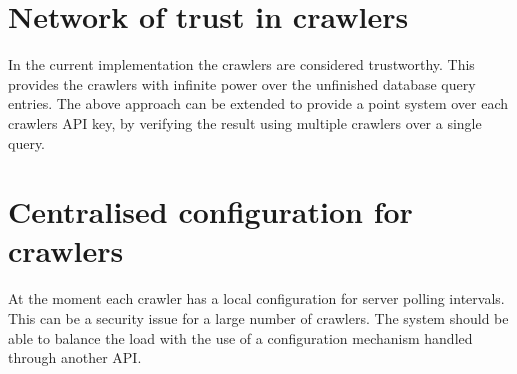    \section{Network of trust in crawlers}
        In the current implementation the crawlers are considered trustworthy.
        This provides the crawlers with infinite power over the unfinished
        database query entries. The above approach can be extended to provide
        a point system over each crawlers API key, by verifying the result
        using multiple crawlers over a single query.
    \section{Centralised configuration for crawlers}
        At the moment each crawler has a local configuration for server
        polling intervals. This can be a security issue for a large number of
        crawlers. The system should be able to balance the load with the use
        of a configuration mechanism handled through another API.

